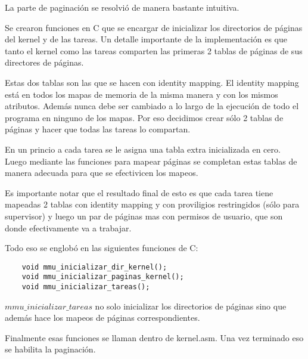 	La parte de paginación se resolvió de manera bastante intuitiva.

	Se crearon funciones en C que se encargar de inicializar los directorios
de páginas del kernel y de las tareas. Un detalle importante de la implementación
es que tanto el kernel como las tareas comparten las primeras 2 tablas de páginas
de sus directores de páginas.

	Estas dos tablas son las que se hacen con identity mapping. El identity mapping
está en todos los mapas de memoria de la misma manera y con los mismos atributos. Además
nunca debe ser cambiado a lo largo de la ejecución de todo el programa en ninguno de los
mapas. Por eso decidimos crear sólo 2 tablas de páginas y hacer que todas las tareas lo compartan.

	En un princio a cada tarea se le asigna una tabla extra inicializada en cero.
Luego mediante las funciones para mapear páginas se completan estas tablas de manera adecuada
para que se efectivicen los mapeos.

	Es importante notar que el resultado final de esto es que cada tarea tiene mapeadas
2 tablas con identity mapping y con proviligios restringidos (sólo para supervisor) y
luego un par de páginas mas con permisos de usuario, que son donde efectivamente va a trabajar.

	Todo eso se englobó en las siguientes funciones de C:
	
\begin{verbatim}
	void mmu_inicializar_dir_kernel();
	void mmu_inicializar_paginas_kernel();
	void mmu_inicializar_tareas();
\end{verbatim}

	$mmu\_inicializar\_tareas$ no solo inicializar los directorios de páginas sino
que además hace los mapeos de páginas correspondientes.

	Finalmente esas funciones se llaman dentro de kernel.asm. Una vez terminado eso
se habilita la paginación.
